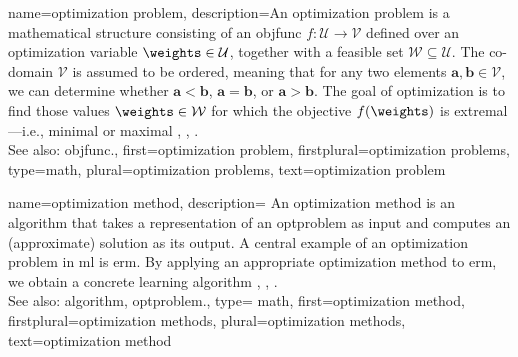 {name={optimization problem}, 
	description={An optimization problem is a mathematical 
		   structure consisting of an \gls{objfunc} $f: \mathcal{U} \rightarrow \mathcal{V}$ 
		   defined over an optimization variable $\weights \in \mathcal{U}$, together with a 
		   feasible set $\mathcal{W} \subseteq \mathcal{U}$. The co-domain $\mathcal{V}$ is 
		   assumed to be ordered, meaning that for any two elements $\mathbf{a}, \mathbf{b} \in \mathcal{V}$, 
		   we can determine whether $\mathbf{a} < \mathbf{b}$, $\mathbf{a} = \mathbf{b}$, 
		   or $\mathbf{a} > \mathbf{b}$. The goal of optimization is to find those values $\weights \in \mathcal{W}$ 
		   for which the objective $f(\weights)$ is extremal—i.e., minimal or maximal \cite{BoydConvexBook}, \cite{BertsekasNonLinProgr}, \cite{nesterov04}.
		   \\
		   See also: \gls{objfunc}.},
	first={optimization problem},
	firstplural={optimization problems}, 
	type=math,
	plural={optimization problems}, 
	text={optimization problem}
}

{name={optimization method},
	description={
	An optimization method is 
	an \gls{algorithm} that takes a representation of an 
	\gls{optproblem} as input and computes an (approximate) 
	solution as its output. A central example of an optimization 
	problem in \gls{ml} is \gls{erm}. By applying an appropriate 
	optimization method to \gls{erm}, we obtain a concrete learning 
	\gls{algorithm} \cite{BoydConvexBook}, \cite{BertsekasNonLinProgr},
	\cite{nesterov04}.
		 \\
		 See also: \gls{algorithm}, \gls{optproblem}.},
	type= math, 
	first={optimization method},
	firstplural={optimization methods}, 
	plural={optimization methods}, 
	text={optimization method}
}

